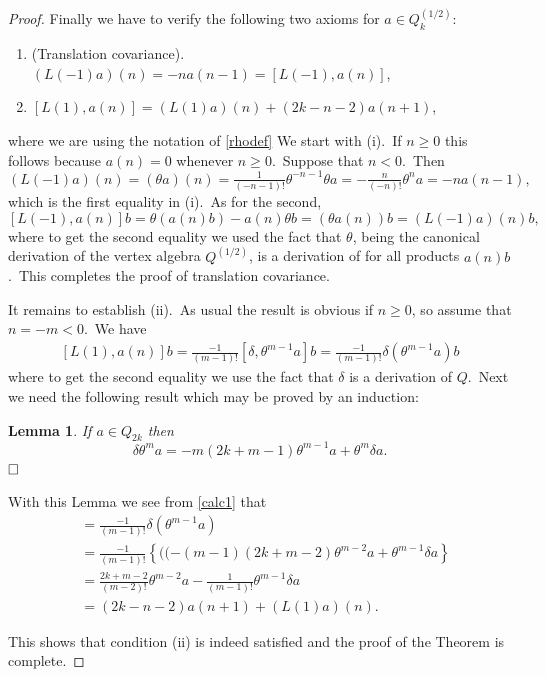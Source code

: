 \documentclass[12pt]{amsart}
\theoremstyle{plain}
\newtheorem{lem}[thm]{Lemma}
\theoremstyle{definition}
\theoremstyle{remark}
\begin{document}
\begin{proof}
\medskip
Finally we have to verify the following two axioms for $a\in Q_k^{(1/2)}$:
\begin{enumerate}
    \item[(i)] (Translation covariance).\ $(L(-1)a)(n)= -na(n-1)=[L(-1), a(n)]$,
    \item[(ii)] $[L(1), a(n)] = (L(1)a)(n)+(2k-n-2)a(n+1)$, 
\end{enumerate}
where we are using the notation of  \eqref{rhodef}
We start with (i).\
If $n\geq0$ this follows because $a(n)=0$ whenever $n\geq0$.\ Suppose that $n<0$.\ Then
$$(L(-1)a)(n)= (\theta a)(n)=\tfrac{1}{(-n-1)!} \theta^{-n-1}\theta a=-\tfrac{n}{(-n)!}\theta^na=-na(n-1),$$
which is the first equality in (i).\ As for the second,
$$[L(-1), a(n)]b=\theta(a(n)b)-a(n)\theta b=(\theta a(n))b=(L(-1)a)(n)b,$$
where to get the second equality we used the fact that $\theta$, being the canonical derivation of the vertex algebra $Q^{(1/2)}$,  is a derivation of for all products $a(n)b$.\ This completes the proof of translation covariance.

\medskip
It remains to establish (ii).\ As usual the result is obvious if $n\geq0$, so assume that
$n=-m<0$.\ We have
\begin{eqnarray}\label{calc1}
[L(1), a(n)]b = \tfrac{-1}{(m-1)!}[\delta, \theta^{m-1}a]b=\tfrac{-1}{(m-1)!} \delta(\theta^{m-1}a)b       
\end{eqnarray}
where to get the second equality we use the fact that $\delta$ is a derivation of $Q$.\ Next we need the following result which may be proved by an induction:
\begin{lem} If $a\in Q_{2k}$ then 
$$\delta \theta^ma = -m(2k+m-1) \theta^{m-1}a + \theta^m\delta a. $$
$\hfill\Box$
\end{lem}

With this Lemma we see from \eqref{calc1} that
\begin{align*} 
[L(1), a(n)] &= \tfrac{-1}{(m-1)!}\delta(\theta^{m-1}a)\\
&=\tfrac{-1}{(m-1)!} \left\{ ((-(m- 1)(2k+m-2)\theta^{m-2}a +\theta^{m-1}\delta a\right\}  \\
&=  \tfrac{2k+m-2}{(m-2)!} \theta^{m-2}a - \tfrac{1}{(m-1)!}\theta^{m-1}\delta a \\
&= (2k-n-2)a(n+1)  + (L(1) a)(n).
\end{align*}

This shows that condition (ii) is indeed satisfied and the proof of the Theorem is complete.
\end{proof}
\end{document}
